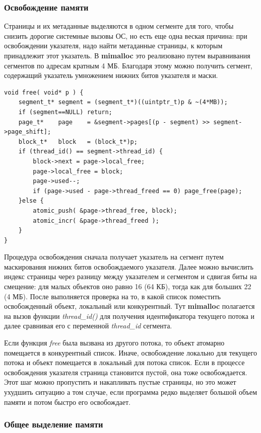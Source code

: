 \subsubsection{Освобождение памяти}

Страницы и их метаданные выделяются в одном сегменте для того, чтобы снизить дорогие системные вызовы ОС, но есть еще одна веская причина: при освобождении указателя, надо найти метаданные страницы, к которым принадлежит этот указатель. В \textbf{mimalloc} это реализовано путем выравнивания сегментов по адресам кратным 4 МБ. Благодаря этому можно получить сегмент, содержащий указатель умножением нижних битов указателя и маски.

\begin{lstlisting}
void free( void* p ) {
	segment_t* segment = (segment_t*)((uintptr_t)p & ~(4*MB));
	if (segment==NULL) return;
	page_t*    page    = &segment->pages[(p - segment) >> segment->page_shift];
	block_t*   block   = (block_t*)p;
	if (thread_id() == segment->thread_id) {
		block->next = page->local_free;
		page->local_free = block;
		page->used--;
		if (page->used - page->thread_freed == 0) page_free(page);
	}else {
		atomic_push( &page->thread_free, block);
		atomic_incr( &page->thread_freed );
	}
}
\end{lstlisting}

Процедура освобождения сначала получает указатель на сегмент путем маскирования нижних битов освобождаемого указателя. Далее можно вычислить индекс страницы через разницу между указателем и сегментом и сдвигая биты на смещение: для малых объектов оно равно 16 (64 КБ), тогда как для больших 22 (4 МБ). После выполняется проверка на то, в какой список поместить освобожденный объект, локальный или конкурентный. Тут \textbf{mimalloc} полагается на вызов функции \textit{thread\_id()} для получения идентификатора текущего потока и далее сравнивая его с переменной \textit{thread\_id} сегмента.

Если функция \textit{free} была вызвана из другого потока, то объект атомарно помещается в конкурентный список. Иначе, освобождение локально для текущего потока и объект помещается в локальный для потока список. Если в процессе освобождения указателя страница становится пустой, она тоже освобождается. Этот шаг можно пропустить и накапливать пустые страницы, но это может ухудшить ситуацию а том случае, если программа редко выделяет большой объем памяти и потом быстро его освобождает.

\subsubsection{Общее выделение памяти}

